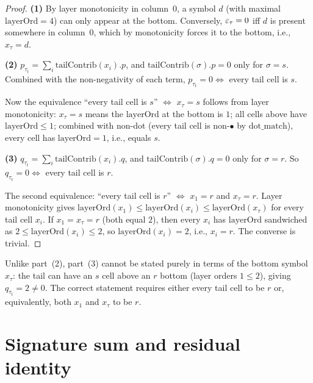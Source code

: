 \begin{proof}
  \leanok

  \textbf{(1)} By layer monotonicity in column~0, a symbol $d$ (with maximal
  $\mathrm{layerOrd} = 4$) can only appear at the bottom.
  Conversely, $\varepsilon_\tau = 0$ iff $d$ is present somewhere in column~0, which
  by monotonicity forces it to the bottom, i.e., $x_\tau = d$.

  \textbf{(2)} $p_{\tau_t} = \sum_i \mathrm{tailContrib}(x_i).p$, and
  $\mathrm{tailContrib}(\sigma).p = 0$ only for $\sigma = s$. Combined with
  the non-negativity of each term, $p_{\tau_t} = 0 \iff $ every tail cell is $s$.

  Now the equivalence ``every tail cell is $s$'' $\iff$ $x_\tau = s$ follows
  from layer monotonicity: $x_\tau = s$ means the $\mathrm{layerOrd}$ at the
  bottom is $1$; all cells above have $\mathrm{layerOrd} \leq 1$; combined
  with non-dot (every tail cell is non-$\bullet$ by $\mathrm{dot\_match}$),
  every cell has $\mathrm{layerOrd} = 1$, i.e., equals $s$.

  \textbf{(3)} $q_{\tau_t} = \sum_i \mathrm{tailContrib}(x_i).q$, and
  $\mathrm{tailContrib}(\sigma).q = 0$ only for $\sigma = r$. So
  $q_{\tau_t} = 0 \iff$ every tail cell is $r$.

  The second equivalence: ``every tail cell is $r$'' $\iff$ $x_1 = r$ and
  $x_\tau = r$. Layer monotonicity gives
  $\mathrm{layerOrd}(x_1) \leq \mathrm{layerOrd}(x_i) \leq \mathrm{layerOrd}(x_\tau)$
  for every tail cell $x_i$. If $x_1 = x_\tau = r$ (both equal $2$), then
  every $x_i$ has $\mathrm{layerOrd}$ sandwiched as $2 \leq \mathrm{layerOrd}(x_i) \leq 2$,
  so $\mathrm{layerOrd}(x_i) = 2$, i.e., $x_i = r$. The converse is trivial.
\end{proof}

\begin{remark}
  Unlike part~(2), part~(3) cannot be stated purely in terms of the bottom
  symbol $x_\tau$: the tail can have an $s$ cell above an $r$ bottom (layer
  orders $1 \leq 2$), giving $q_{\tau_t} = 2 \neq 0$. The correct statement
  requires either every tail cell to be $r$ or, equivalently, both $x_1$ and
  $x_\tau$ to be $r$.
\end{remark}

\section{Signature sum and residual identity}

